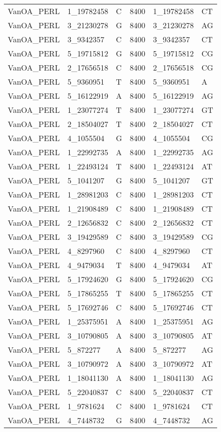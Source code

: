 \begin{center}
\begin{longtable}{|l|l|l|l|l|l|}
VanOA\_PERL&1\_19782458&C&8400&1\_19782458&CT\\
VanOA\_PERL&3\_21230278&G&8400&3\_21230278&AG\\
VanOA\_PERL&3\_9342357&C&8400&3\_9342357&CT\\
VanOA\_PERL&5\_19715812&G&8400&5\_19715812&CG\\
VanOA\_PERL&2\_17656518&C&8400&2\_17656518&CG\\
VanOA\_PERL&5\_9360951&T&8400&5\_9360951&A\\
VanOA\_PERL&5\_16122919&A&8400&5\_16122919&AG\\
VanOA\_PERL&1\_23077274&T&8400&1\_23077274&GT\\
VanOA\_PERL&2\_18504027&T&8400&2\_18504027&CT\\
VanOA\_PERL&4\_1055504&G&8400&4\_1055504&CG\\
VanOA\_PERL&1\_22992735&A&8400&1\_22992735&AG\\
VanOA\_PERL&1\_22493124&T&8400&1\_22493124&AT\\
VanOA\_PERL&5\_1041207&G&8400&5\_1041207&GT\\
VanOA\_PERL&1\_28981203&C&8400&1\_28981203&CT\\
VanOA\_PERL&1\_21908489&C&8400&1\_21908489&CT\\
VanOA\_PERL&2\_12656832&C&8400&2\_12656832&CT\\
VanOA\_PERL&3\_19429589&C&8400&3\_19429589&CG\\
VanOA\_PERL&4\_8297960&C&8400&4\_8297960&CT\\
VanOA\_PERL&4\_9479034&T&8400&4\_9479034&AT\\
VanOA\_PERL&5\_17924620&G&8400&5\_17924620&CG\\
VanOA\_PERL&5\_17865255&T&8400&5\_17865255&CT\\
VanOA\_PERL&5\_17692746&C&8400&5\_17692746&CT\\
VanOA\_PERL&1\_25375951&A&8400&1\_25375951&AG\\
VanOA\_PERL&3\_10790805&A&8400&3\_10790805&AT\\
VanOA\_PERL&5\_872277&A&8400&5\_872277&AG\\
VanOA\_PERL&3\_10790972&A&8400&3\_10790972&AT\\
VanOA\_PERL&1\_18041130&A&8400&1\_18041130&AG\\
VanOA\_PERL&5\_22040837&C&8400&5\_22040837&CT\\
VanOA\_PERL&1\_9781624&C&8400&1\_9781624&CT\\
VanOA\_PERL&4\_7448732&G&8400&4\_7448732&AG\\

\end{longtable}
\end{center}

